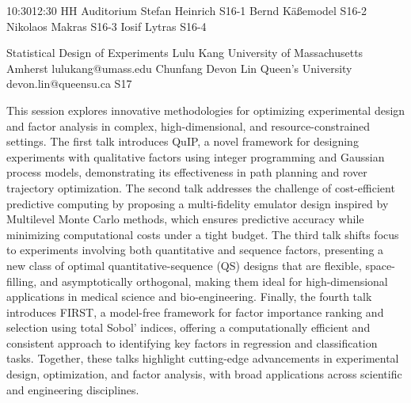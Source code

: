 \documentclass[12pt,lettersize,oneside]{book} %
\begin{document}
\sessionPart{}%
{\hfill{}
{10:30}{12:30} %
{HH Auditorium}} %
{Stefan Heinrich}
{S16-1}
{Bernd Käßemodel}
{S16-2}
{Nikolaos Makras}
{S16-3}
{Iosif Lytras}
{S16-4}



\clearpage

\begin{session}
 {Statistical Design of Experiments}%
 {Lulu Kang}%
 {University of Massachusetts Amherst}%
 {lulukang@umass.edu}%
 {Chunfang Devon Lin}%
 {Queen's University}%
 {devon.lin@queensu.ca}%
 {S17}%
{}

 \medskip
 This session explores innovative methodologies for optimizing experimental design and factor analysis in complex, high-dimensional, and resource-constrained settings. The first talk introduces QuIP, a novel framework for designing experiments with qualitative factors using integer programming and Gaussian process models, demonstrating its effectiveness in path planning and rover trajectory optimization. The second talk addresses the challenge of cost-efficient predictive computing by proposing a multi-fidelity emulator design inspired by Multilevel Monte Carlo methods, which ensures predictive accuracy while minimizing computational costs under a tight budget. The third talk shifts focus to experiments involving both quantitative and sequence factors, presenting a new class of optimal quantitative-sequence (QS) designs that are flexible, space-filling, and asymptotically orthogonal, making them ideal for high-dimensional applications in medical science and bio-engineering. Finally, the fourth talk introduces FIRST, a model-free framework for factor importance ranking and selection using total Sobol' indices, offering a computationally efficient and consistent approach to identifying key factors in regression and classification tasks. Together, these talks highlight cutting-edge advancements in experimental design, optimization, and factor analysis, with broad applications across scientific and engineering disciplines.
\end{session}
\end{document}

